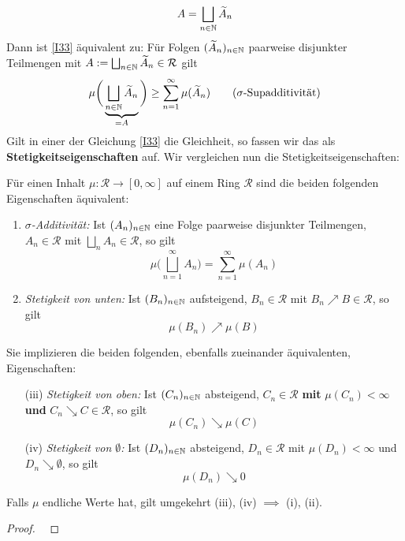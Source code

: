 \begin{equation*}
	A = \bigsqcup_{n\in \mathbb{N}} \widetilde{A}_n
\end{equation*}
Dann ist \eqref{I33} äquivalent zu: Für Folgen $(\widetilde{A}_n)_{n \in \mathbb{N}}$ paarweise disjunkter Teilmengen mit $A:=\bigsqcup_{n\in\mathbb{N}}\widetilde{A}_n \in \mathcal{R}$ gilt
\begin{equation*}
\mu\bigg( \underbrace{\bigsqcup_{n\in \mathbb{N}} \widetilde{A}_n}_{=A} \bigg) \geq \sum_{n=1}^\infty \mu(\widetilde{A}_n)
\tag{$\sigma$-Supadditivität}
\end{equation*}
Gilt in einer der Gleichung \eqref{I33} die Gleichheit, so fassen wir das als \textbf{Stetigkeitseigenschaften} auf. Wir vergleichen nun die Stetigkeitseigenschaften:

\begin{proposition}
\begin{mdframed}
Für einen Inhalt $\mu : \mathcal{R} \longrightarrow [0,\infty]$ auf einem Ring $\mathcal{R}$ sind die beiden folgenden Eigenschaften äquivalent:
\begin{enumerate}[(\roman*),topsep=5pt, itemsep = 0 pt]
	\item \emph{$\sigma$-Additivität:} Ist $(A_n)_{n \in \mathbb{N}}$ eine Folge paarweise disjunkter Teilmengen, $A_n \in \mathcal{R}$ mit $\bigsqcup_nA_n \in \mathcal{R}$, so gilt
	$$
	\mu \bigg(\bigsqcup_{n=1}^\infty A_n \bigg) = \sum_{n=1}^\infty \mu (A_n)	
	$$
	\item \textit{Stetigkeit von unten:} Ist $(B_n)_{n\in\mathbb{N}}$ aufsteigend, $B_n \in \mathcal{R}$ mit $B_n \nearrow B \in \mathcal{R}$, so gilt
	$$
	\mu (B_n) \nearrow \mu (B)	
	$$
\end{enumerate}
	Sie implizieren die beiden folgenden, ebenfalls zueinander äquivalenten, Eigenschaften:
	\begin{enumerate}[(\roman*),topsep=5pt, itemsep = 0 pt]
	\item[(iii)] \emph{Stetigkeit von oben:} Ist $(C_n)_{n \in \mathbb{N}}$ absteigend, $C_n \in \mathcal{R}$ \textbf{mit} $\mu(C_n) < \infty$ \textbf{und} $C_n \searrow C \in \mathcal{R}$, so gilt
	$$
	\mu(C_n) \searrow \mu (C)	
	$$
	\item[(iv)] \emph{Stetigkeit von $\emptyset$:} Ist $(D_n)_{n \in \mathbb{N}}$ absteigend, $D_n \in \mathcal{R}$ mit $\mu(D_n) < \infty$ und $D_n \searrow \emptyset$, so gilt
	$$ \mu (D_n) \searrow 0$$
	\end{enumerate}
	Falls $\mu$ endliche Werte hat, gilt umgekehrt (iii), (iv) $\implies$ (i), (ii).
\end{mdframed}
\begin{proof}\

\end{proof}
\end{proposition}
